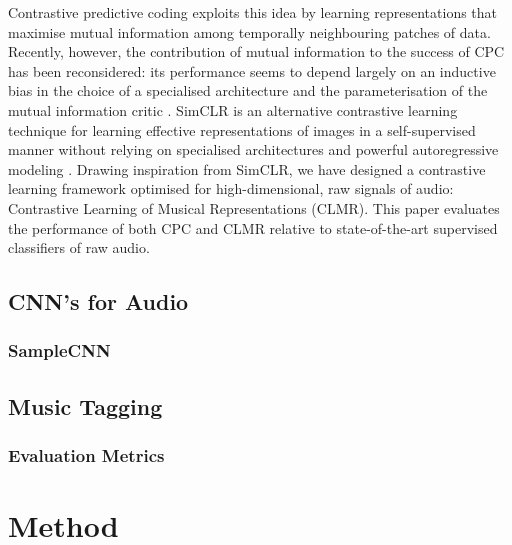 \documentclass{report}
\begin{document}
Contrastive predictive coding exploits this idea by learning representations that maximise mutual information among temporally neighbouring patches of data\cite{oord_representation_2019, hjelm_learning_2019}. Recently, however, the contribution of mutual information to the success of CPC has been reconsidered: its performance seems to depend largely on an inductive bias in the choice of a specialised architecture and the parameterisation of the mutual information critic \cite{Tschannen2020OnMI}. SimCLR is an alternative contrastive learning technique for learning effective representations of images in a self-supervised manner without relying on specialised architectures and powerful autoregressive modeling \cite{chen_simple_2020}. Drawing inspiration from SimCLR, we have designed a contrastive learning framework optimised for high-dimensional, raw signals of audio: Contrastive Learning of Musical Representations (CLMR). This paper evaluates the performance of both CPC and CLMR relative to state-of-the-art supervised classifiers of raw audio.

\section{CNN's for Audio}
\subsection{SampleCNN}

\section{Music Tagging}

\subsection{Evaluation Metrics}


\chapter{Method}
\end{document}

